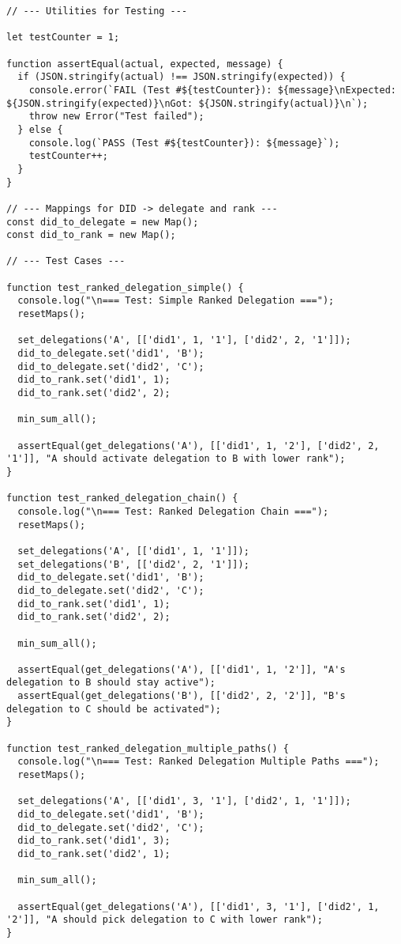 \begin{verbatim}
// --- Utilities for Testing ---

let testCounter = 1;

function assertEqual(actual, expected, message) {
  if (JSON.stringify(actual) !== JSON.stringify(expected)) {
    console.error(`FAIL (Test #${testCounter}): ${message}\nExpected: ${JSON.stringify(expected)}\nGot: ${JSON.stringify(actual)}\n`);
    throw new Error("Test failed");
  } else {
    console.log(`PASS (Test #${testCounter}): ${message}`);
    testCounter++;
  }
}

// --- Mappings for DID -> delegate and rank ---
const did_to_delegate = new Map();
const did_to_rank = new Map();

// --- Test Cases ---

function test_ranked_delegation_simple() {
  console.log("\n=== Test: Simple Ranked Delegation ===");
  resetMaps();

  set_delegations('A', [['did1', 1, '1'], ['did2', 2, '1']]);
  did_to_delegate.set('did1', 'B');
  did_to_delegate.set('did2', 'C');
  did_to_rank.set('did1', 1);
  did_to_rank.set('did2', 2);

  min_sum_all();

  assertEqual(get_delegations('A'), [['did1', 1, '2'], ['did2', 2, '1']], "A should activate delegation to B with lower rank");
}

function test_ranked_delegation_chain() {
  console.log("\n=== Test: Ranked Delegation Chain ===");
  resetMaps();

  set_delegations('A', [['did1', 1, '1']]);
  set_delegations('B', [['did2', 2, '1']]);
  did_to_delegate.set('did1', 'B');
  did_to_delegate.set('did2', 'C');
  did_to_rank.set('did1', 1);
  did_to_rank.set('did2', 2);

  min_sum_all();

  assertEqual(get_delegations('A'), [['did1', 1, '2']], "A's delegation to B should stay active");
  assertEqual(get_delegations('B'), [['did2', 2, '2']], "B's delegation to C should be activated");
}

function test_ranked_delegation_multiple_paths() {
  console.log("\n=== Test: Ranked Delegation Multiple Paths ===");
  resetMaps();

  set_delegations('A', [['did1', 3, '1'], ['did2', 1, '1']]);
  did_to_delegate.set('did1', 'B');
  did_to_delegate.set('did2', 'C');
  did_to_rank.set('did1', 3);
  did_to_rank.set('did2', 1);

  min_sum_all();

  assertEqual(get_delegations('A'), [['did1', 3, '1'], ['did2', 1, '2']], "A should pick delegation to C with lower rank");
}


\end{verbatim}
